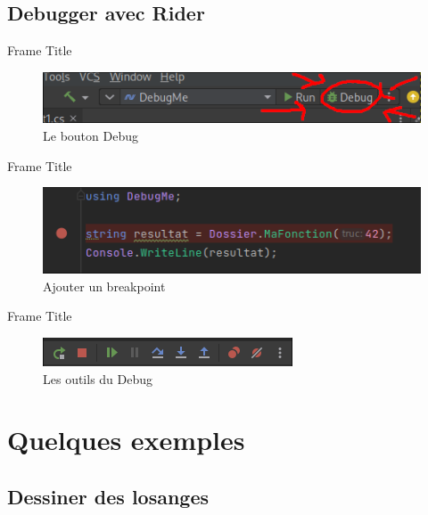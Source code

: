 \documentclass[aspectratio=169]{beamer}
\begin{document}
\subsection{Debugger avec Rider}
\begin{frame}{Frame Title}    
\begin{figure}
    \centering
    \includegraphics[width=\textwidth]{img/bouton_debug.png}
    \caption{Le bouton Debug}
    \label{fig:debug-button}
\end{figure}
\end{frame}

\begin{frame}{Frame Title}
\begin{figure}
    \centering
    \includegraphics[width=\textwidth]{img/breakpoint.png}
    \caption{Ajouter un breakpoint}
    \label{fig:breakpoint}
\end{figure}
\end{frame}

\begin{frame}{Frame Title}
\begin{figure}
    \centering
    \includegraphics[width=\textwidth]{img/debug_bar.png}
    \caption{Les outils du Debug}
    \label{fig:debug-bar}
\end{figure}
\end{frame}

\section{Quelques exemples}
\subsection{Dessiner des losanges}
\end{document}
